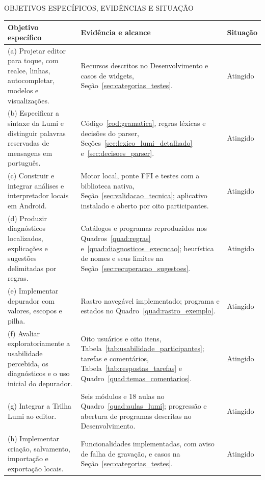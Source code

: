 \documentclass[
    12pt
    ,oneside
    ,a4paper
    ,chapter=TITLE
    ,section=TITLE
    ,sumario=abnt-6027-2012]{abntex2}
\renewcommand{\legenda}[2][]{%
    \centering
    \caption[\MakeTextUppercase{#2}]{\maybeLabel{#1}\MakeTextUppercase{#2}}%
}
\begin{document}
\begin{quadro}[htb]
\centering
\legenda[quad:objetivos_evidencias]{Objetivos específicos, evidências e situação}
\footnotesize
\renewcommand{\arraystretch}{1.1}
\begin{tabular}{|P{4.0cm}|P{6.8cm}|P{2.5cm}|}
\hline
Objetivo específico & Evidência e alcance & Situação \\
\hline\hline
(a) Projetar editor para toque, com realce, linhas, autocompletar, modelos e visualizações. & Recursos descritos no Desenvolvimento e casos de widgets, Seção~\ref{sec:categorias_testes}. & Atingido \\
\hline
(b) Especificar a sintaxe da Lumi e distinguir palavras reservadas de mensagens em português. & Código~\ref{cod:gramatica}, regras léxicas e decisões do parser, Seções~\ref{sec:lexico_lumi_detalhado} e~\ref{sec:decisoes_parser}. & Atingido \\
\hline
(c) Construir e integrar análises e interpretador locais em Android. & Motor local, ponte FFI e testes com a biblioteca nativa, Seção~\ref{sec:validacao_tecnica}; aplicativo instalado e aberto por oito participantes. & Atingido \\
\hline
(d) Produzir diagnósticos localizados, explicações e sugestões delimitadas por regras. & Catálogos e programas reproduzidos nos Quadros~\ref{quad:regras} e~\ref{quad:diagnosticos_execucao}; heurística de nomes e seus limites na Seção~\ref{sec:recuperacao_sugestoes}. & Atingido \\
\hline
(e) Implementar depurador com valores, escopos e pilha. & Rastro navegável implementado; programa e estados no Quadro~\ref{quad:rastro_exemplo}. & Atingido \\
\hline
(f) Avaliar exploratoriamente a usabilidade percebida, os diagnósticos e o uso inicial do depurador. & Oito usuários e oito itens, Tabela~\ref{tab:usabilidade_participantes}; tarefas e comentários, Tabela~\ref{tab:respostas_tarefas} e Quadro~\ref{quad:temas_comentarios}. & Atingido \\
\hline
(g) Integrar a Trilha Lumi ao editor. & Seis módulos e 18 aulas no Quadro~\ref{quad:aulas_lumi}; progressão e abertura de programas descritas no Desenvolvimento. & Atingido \\
\hline
(h) Implementar criação, salvamento, importação e exportação locais. & Funcionalidades implementadas, com aviso de falha de gravação, e casos na Seção~\ref{sec:categorias_testes}. & Atingido \\
\hline
\end{tabular}
\vspace{0.2cm}
\end{quadro}
\FloatBarrier
\end{document}
